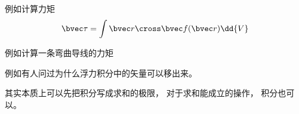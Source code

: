 
\begin{issues}
\issueDraft
\end{issues}

例如计算力矩
\begin{equation}
\bvec \tau = \int \bvec r \cross \bvec f(\bvec r) \dd{V}
\end{equation}

例如计算一条弯曲导线的力矩

例如有人问过为什么浮力积分中的矢量可以移出来。

其实本质上可以先把积分写成求和的极限， 对于求和能成立的操作， 积分也可以。
